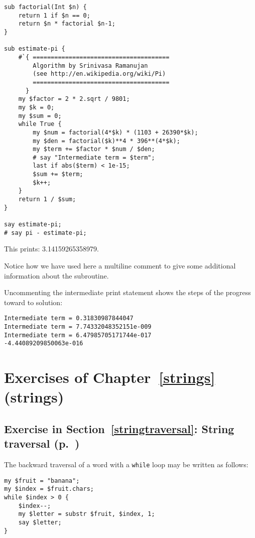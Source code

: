 \begin{verbatim}
sub factorial(Int $n) {
    return 1 if $n == 0;
    return $n * factorial $n-1;
}

sub estimate-pi {
    #`{ ======================================
        Algorithm by Srinivasa Ramanujan 
        (see http://en.wikipedia.org/wiki/Pi)
        ======================================
      }
    my $factor = 2 * 2.sqrt / 9801;
    my $k = 0;
    my $sum = 0;
    while True {
        my $num = factorial(4*$k) * (1103 + 26390*$k);
        my $den = factorial($k)**4 * 396**(4*$k);
        my $term += $factor * $num / $den;
        # say "Intermediate term = $term";
        last if abs($term) < 1e-15;
        $sum += $term;
        $k++;
    }
    return 1 / $sum;
}

say estimate-pi;
# say pi - estimate-pi;
\end{verbatim}

This prints: 3.14159265358979.

Notice how we have used here a multiline comment to 
give some additional information about the subroutine.

Uncommenting the intermediate print statement shows the 
steps of the progress toward to solution:

\begin{verbatim}
Intermediate term = 0.31830987844047
Intermediate term = 7.74332048352151e-009
Intermediate term = 6.47985705171744e-017
-4.44089209850063e-016
\end{verbatim}

\section{Exercises of Chapter~\ref{strings} (strings)}

\subsection{Exercise in Section~\ref{stringtraversal}: String traversal (p.~\pageref{stringtraversal})}
\label{sol_stringtraversal}

The backward traversal of a word with a {\tt while} loop may
be written as follows:

\begin{verbatim}
my $fruit = "banana";
my $index = $fruit.chars;
while $index > 0 { 
    $index--;
    my $letter = substr $fruit, $index, 1; 
    say $letter; 
}
\end{verbatim}
%

